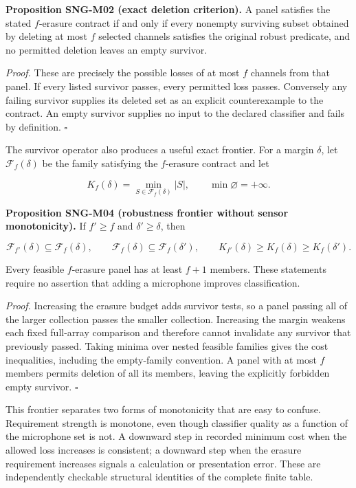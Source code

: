 \documentclass[
  11pt,
  a4paper,
]{report}
\begin{document}
\textbf{Proposition SNG-M02 (exact deletion criterion).} A panel
satisfies the stated \(f\)-erasure contract if and only if every
nonempty surviving subset obtained by deleting at most \(f\) selected
channels satisfies the original robust predicate, and no permitted
deletion leaves an empty survivor.

\emph{Proof.} These are precisely the possible losses of at most \(f\)
channels from that panel. If every listed survivor passes, every
permitted loss passes. Conversely any failing survivor supplies its
deleted set as an explicit counterexample to the contract. An empty
survivor supplies no input to the declared classifier and fails by
definition. \(\square\)

The survivor operator also produces a useful exact frontier. For a
margin \(\delta\), let \(\mathcal F_f(\delta)\) be the family satisfying
the \(f\)-erasure contract and let

\[
K_f(\delta)=\min_{S\in\mathcal F_f(\delta)}|S|,
\qquad \min\varnothing=+\infty.
\]

\textbf{Proposition SNG-M04 (robustness frontier without sensor
monotonicity).} If \(f'\ge f\) and \(\delta'\ge\delta\), then

\[
\mathcal F_{f'}(\delta)\subseteq\mathcal F_f(\delta),\qquad
\mathcal F_f(\delta)\subseteq\mathcal F_f(\delta'),\qquad
K_{f'}(\delta)\ge K_f(\delta)\ge K_f(\delta').
\]

Every feasible \(f\)-erasure panel has at least \(f+1\) members. These
statements require no assertion that adding a microphone improves
classification.

\emph{Proof.} Increasing the erasure budget adds survivor tests, so a
panel passing all of the larger collection passes the smaller
collection. Increasing the margin weakens each fixed full-array
comparison and therefore cannot invalidate any survivor that previously
passed. Taking minima over nested feasible families gives the cost
inequalities, including the empty-family convention. A panel with at
most \(f\) members permits deletion of all its members, leaving the
explicitly forbidden empty survivor. \(\square\)

This frontier separates two forms of monotonicity that are easy to
confuse. Requirement strength is monotone, even though classifier
quality as a function of the microphone set is not. A downward step in
recorded minimum cost when the allowed loss increases is consistent; a
downward step when the erasure requirement increases signals a
calculation or presentation error. These are independently checkable
structural identities of the complete finite table.
\end{document}

